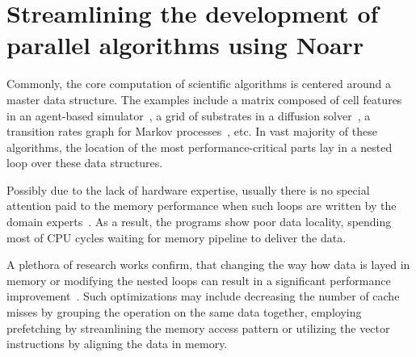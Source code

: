 \chapter{Streamlining the development of parallel algorithms using Noarr}





Commonly, the core computation of scientific algorithms is centered around a master data structure. The examples include a matrix composed of cell features in an agent-based simulator~\cite{ghaffarizadeh2018physicell}, a grid of substrates in a diffusion solver~\cite{ghaffarizadeh2016biofvm}, a transition rates graph for Markov processes~\cite{koltai2020exact}, etc. In vast majority of these algorithms, the location of the most performance-critical parts lay in a nested loop over these data structures.

Possibly due to the lack of hardware expertise, usually there is no special attention paid to the memory performance when such loops are written by the domain experts~\cite{clauss2000automatic}. As a result, the programs show poor data locality, spending most of CPU cycles waiting for memory pipeline to deliver the data. 

A plethora of research works confirm, that changing the way how data is layed in memory or modifying the nested loops can result in a significant performance improvement~\cite{gong2018empirical,stengel2015quantifying,serpa2019memory}. Such optimizations may include decreasing the number of cache misses by grouping the operation on the same data together, employing prefetching by streamlining the memory access pattern or utilizing the vector instructions by aligning the data in memory.

